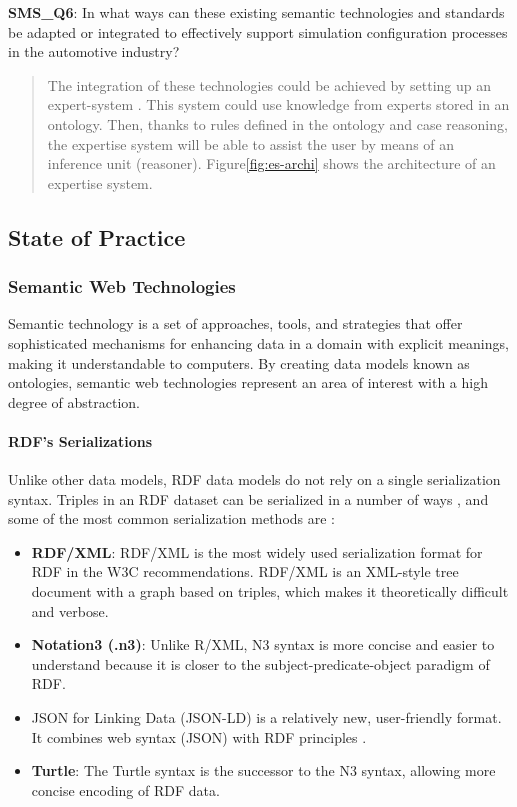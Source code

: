             \textbf{SMS\_Q6}: In what ways can these existing semantic technologies and standards be adapted or integrated to effectively support simulation configuration processes in the automotive industry?
            \begin{quote}
                The integration of these technologies could be achieved by setting up an expert-system \cite{happel2006applications}. This system could use knowledge from experts stored in an ontology. Then, thanks to rules defined in the ontology and case reasoning, the expertise system will be able to assist the user by means of an inference unit (reasoner).  Figure\ref{fig:es-archi} shows the architecture of an expertise system.\\
            \end{quote}
        
    \subsection{State of Practice}
        \subsubsection{Semantic Web Technologies\label{sec:semtec}}
        Semantic technology is a set of approaches, tools, and strategies that offer sophisticated mechanisms for enhancing data in a domain with explicit meanings, making it understandable to computers. By creating data models known as ontologies, semantic web technologies represent an area of interest with a high degree of abstraction.\\ 
        
            \paragraph{RDF's Serializations}
                Unlike other data models, RDF data models do not rely on a single serialization syntax. Triples in an RDF dataset can be serialized in a number of ways \cite{martinez2012exchange}, and some of the most common serialization methods are : 

                \begin{itemize}
                    \item \textbf{RDF/XML}: RDF/XML is the most widely used serialization format for RDF in the W3C recommendations. RDF/XML is an XML-style tree document with a graph based on triples, which makes it theoretically difficult and verbose. 
                    \item \textbf{Notation3 (.n3)}: Unlike R/XML, N3 syntax is more concise and easier to understand because it is closer to the subject-predicate-object paradigm of RDF. 
                    \item JSON for Linking Data (JSON-LD) is a relatively new, user-friendly format. It combines web syntax (JSON) with RDF principles \cite{grlicky2005overview}. 
                    \item \textbf{Turtle}: The Turtle syntax is the successor to the N3 syntax, allowing more concise encoding of RDF data.
                \end{itemize}

